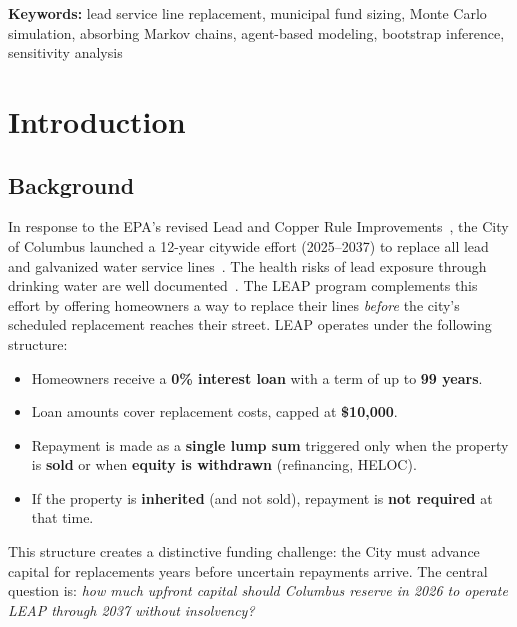 \documentclass[11pt, letterpaper]{article}
\begin{document}
\begin{abstract}
real-time fund management. Break-even analysis identifies 0.20\% as the critical uptake rate at which the P95 funding need crosses the recommended reserve level.
\end{abstract}

\medskip
\noindent\textbf{Keywords:} lead service line replacement, municipal fund sizing, Monte Carlo simulation, absorbing Markov chains, agent-based modeling, bootstrap inference, sensitivity analysis

\vspace{0.3cm}

\section{Introduction}

\subsection{Background}

In response to the EPA's revised Lead and Copper Rule Improvements~\cite{epa2024}, the City of Columbus launched a 12-year citywide effort (2025--2037) to replace all lead and galvanized water service lines~\cite{cornwell2003}. The health risks of lead exposure through drinking water are well documented~\cite{hanna2012,troesken2006}. The LEAP program complements this effort by offering homeowners a way to replace their lines \emph{before} the city's scheduled replacement reaches their street. LEAP operates under the following structure:

\begin{itemize}[nosep]
  \item Homeowners receive a \textbf{0\% interest loan} with a term of up to \textbf{99 years}.
  \item Loan amounts cover replacement costs, capped at \textbf{\$10,000}.
  \item Repayment is made as a \textbf{single lump sum} triggered only when the property is \textbf{sold} or when \textbf{equity is withdrawn} (refinancing, HELOC).
  \item If the property is \textbf{inherited} (and not sold), repayment is \textbf{not required} at that time.
\end{itemize}

This structure creates a distinctive funding challenge: the City must advance capital for replacements years before uncertain repayments arrive. The central question is: \emph{how much upfront capital should Columbus reserve in 2026 to operate LEAP through 2037 without insolvency?}
\end{document}
